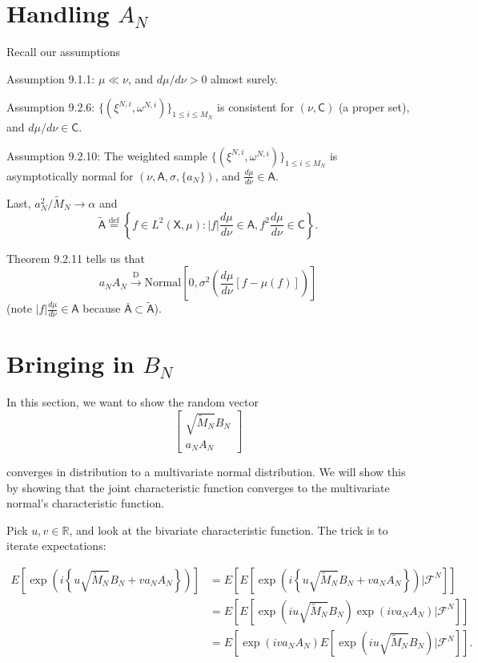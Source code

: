 \documentclass{article}
\begin{document}
\section{Handling $A_N$}

Recall our assumptions

Assumption 9.1.1: $\mu \ll \nu$, and $d\mu/d\nu > 0$ almost surely.

Assumption 9.2.6: $\{(\xi^{N,i}, \omega^{N,i} )\}_{1 \le i \le M_N}$ is consistent for $(\nu, \mathsf{C})$ (a proper set), and $d\mu/d\nu \in \mathsf{C}$. 

Assumption 9.2.10: The weighted sample $\{(\xi^{N,i}, \omega^{N,i})\}_{1 \le i \le M_N}$ is asymptotically normal for $(\nu, \mathsf{A}, \sigma, \{a_N\})$, and $\frac{d\mu}{d\nu} \in \mathsf{A}$.

Last, $a^2_N / \tilde{M}_N \to \alpha$ and 
$$
\tilde{\mathsf{A}} \overset{\text{def}}{=} \left\{ f \in L^2(\mathsf{X}, \mu) : |f| \frac{d\mu}{d\nu} \in \mathsf{A}, f^2 \frac{d\mu}{d\nu} \in \mathsf{C} \right\}.
$$

Theorem 9.2.11 tells us that 
$$
a_NA_N \overset{\text{D}}{\to} \text{Normal}\left[0, \sigma^2\left( \frac{d\mu}{d\nu}\left[f - \mu(f) \right] \right) \right]
$$
(note $|f|\frac{d\mu}{d\nu} \in \mathsf{A}$ because $\bar{\mathsf{A}} \subset \tilde{\mathsf{A}}$).


\section{Bringing in $B_N$}

In this section, we want to show the random vector
$$
\begin{bmatrix}
\sqrt{\tilde{M}_N} B_N \\
a_N A_N
\end{bmatrix}
$$

converges in distribution to a multivariate normal distribution. We will show this by showing that the joint characteristic function converges to the multivariate normal's characteristic function.


Pick $u,v \in \mathbb{R}$, and look at the bivariate characteristic function. The trick is to iterate expectations:

\begin{align*}
E\left[\exp\left(i \left\{ u \sqrt{\tilde{M}_N} B_N + v a_N A_N \right\} \right) \right]
&= E\left[ E\left[ \exp\left(i \left\{ u\sqrt{\tilde{M}_N} B_N + va_N A_N \right\} \right) \bigg\rvert \mathcal{F}^N\right] \right] \\
&= E\left[ E\left[ \exp\left(i u\sqrt{\tilde{M}_N} B_N \right) \exp\left(i v a_N A_N  \right) \bigg\rvert \mathcal{F}^N\right] \right] \\
&= E\left[ \exp\left(i v a_N A_N  \right) E\left[ \exp\left(i u \sqrt{\tilde{M}_N} B_N \right)  \bigg\rvert \mathcal{F}^N\right] \right] .
\end{align*}
\end{document}

